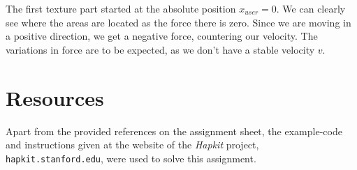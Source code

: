   The first texture part started at the absolute position $x_{user} = 0$. We can clearly see where the areas are located as the force there is zero. Since we are moving in a positive direction, we get a negative force, countering our velocity. The variations in force are to be expected, as we don't have a stable velocity $v$.

  \section*{Resources}

  Apart from the provided references on the assignment sheet, the example-code and instructions given at the website of the \textit{Hapkit} project,\\ \texttt{hapkit.stanford.edu}, were used to solve this assignment.

